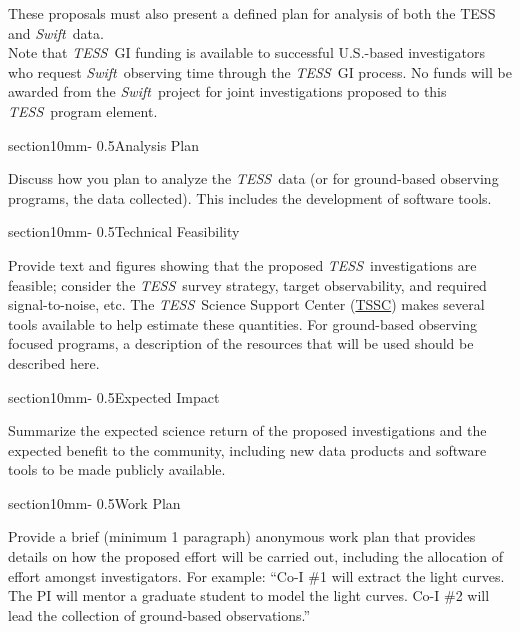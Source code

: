 \documentclass[letterpaper,12pt]{article}
\makeatletter
\renewcommand{\section}{\@startsection%
{section}{1}{0mm}{-\baselineskip}%
{0.5\baselineskip}{\normalfont\Large\bfseries}}%
\newcommand{\tess}{{\it TESS}}
\newcommand{\swift}{{\it Swift}}
\makeatother
\begin{document}
These proposals must also present a defined plan for analysis of both the TESS and \swift\ data.\\

\noindent Note that \tess\ GI funding is available to successful U.S.-based investigators who request \swift\ observing time through the \tess\ GI process. No funds will be awarded from the \swift\ project for joint investigations proposed to this \tess\ program element. 

\section{Analysis Plan}

Discuss how you plan to analyze the \tess\ data (or for ground-based observing programs, the data collected). This includes the development of software tools.

\section{Technical Feasibility}

Provide text and figures showing that the proposed \tess\ investigations are feasible; consider the \tess\ survey strategy, target observability, and required signal-to-noise, etc. The \tess\ Science Support Center (\href{https://heasarc.gsfc.nasa.gov/docs/tess/}{TSSC}) makes several tools available to help estimate these quantities. For ground-based observing focused programs, a description of the resources that will be used should be described here.

\section{Expected Impact}

Summarize the expected science return of the proposed investigations and the expected benefit to the community, including new data products and software tools to be made publicly available.

\section{Work Plan}

Provide a brief (minimum 1 paragraph) anonymous work plan that provides details on how the proposed effort will be carried out, including the allocation of effort amongst investigators. For example: ``Co-I \#1 will extract the light curves. The PI will mentor a graduate student to model the light curves. Co-I \#2 will lead the collection of ground-based observations.'' 
\\
\end{document}
